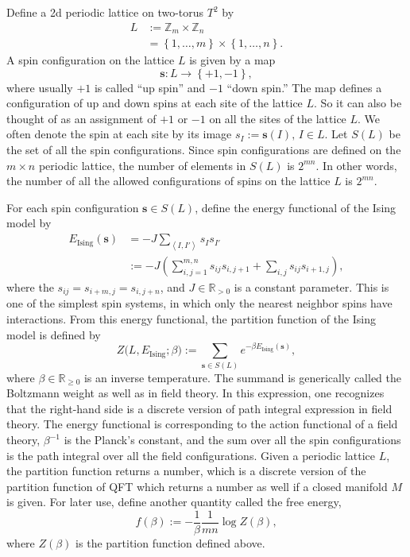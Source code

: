 Define a 2d periodic lattice on two-torus $T^{2}$ by
\begin{align}
L
  & :=  \mathbb{Z}_{m}\times\mathbb{Z}_{n}  \nonumber \\
  & =   \left\{ 1,\ldots,m\right\} \times\left\{ 1,\ldots,n\right\} .
\end{align}
A spin configuration on the lattice $L$ is given by a map
\begin{equation}
  \mathbf{s}  :  L  \longrightarrow  \left\{ +1,-1\right\} ,
\end{equation}
where usually $+1$ is called ``up spin'' and $-1$ ``down spin.'' The
map defines a configuration of up and down spins at each site of the lattice $L$. So it
can also be thought of as an assignment of $+1$ or $-1$ on all the
sites of the lattice $L$. We often denote the spin at each site by
its image $s_{I} := \mathbf{s}(I),\,I\in L$. Let $S(L)$
be the set of all the spin configurations. Since spin configurations
are defined on the $m\times n$ periodic lattice, the number of elements
in $S(L)$ is $2^{mn}$. In other words, the number of
all the allowed configurations of spins on the lattice $L$ is $2^{mn}$.

For each spin configuration $\mathbf{s}\in S(L)$, define
the energy functional of the Ising model by
\begin{align}
  E_{\mathrm{Ising}}(\mathbf{s})
  & =   -J  \sum_{\left\langle I,I'\right\rangle } s_{I}s_{I'}  \nonumber \\
  & :=  -J  \left( \sum_{i,j=1}^{m,n}s_{ij}s_{i,j+1}+\sum_{i,j}s_{ij}s_{i+1,j} \right),
\end{align}
where the $s_{ij}=s_{i+m,j}=s_{i,j+n}$, and $J\in\mathbb{R}_{>0}$
is a constant parameter. This is one of the simplest spin systems,
in which only the nearest neighbor spins have interactions. From this
energy functional, the partition function of the Ising model is defined
by
\begin{equation}
  Z\big(L,E_{\mathrm{Ising}};\beta\big)
    :=  \sum_{\mathbf{s}\in S(L)}  e^{-\beta E_{\mathrm{Ising}}(\mathbf{s})},
\end{equation}
where $\beta\in\mathbb{R}_{\geq0}$ is an inverse temperature. The
summand is generically called the Boltzmann weight as well as in field
theory. In this expression, one recognizes that the right-hand side
is a discrete version of path integral expression in field theory.
The energy functional is corresponding to the action functional of
a field theory, $\beta^{-1}$ is the Planck's constant, and the sum
over all the spin configurations is the path integral over all the
field configurations. Given a periodic lattice $L$, the partition
function returns a number, which is a discrete version of the partition
function of QFT which returns a number as well if a closed manifold
$M$ is given. For later use, define another quantity called the free
energy,
\begin{equation}
  f(\beta)  :=  -\frac{1}{\beta}\frac{1}{mn}\log Z(\beta),
\end{equation}
where $Z(\beta)$ is the partition function defined above.

